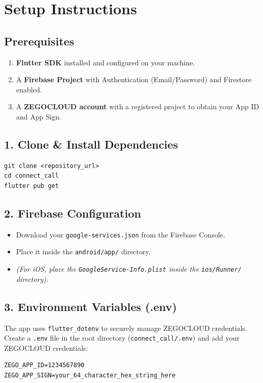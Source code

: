 \documentclass[11pt,a4paper]{article}
\begin{document}
\section*{Setup Instructions}

\subsection*{Prerequisites}
\begin{enumerate}
    \item \textbf{Flutter SDK} installed and configured on your machine.
    \item A \textbf{Firebase Project} with Authentication (Email/Password) and Firestore enabled.
    \item A \textbf{ZEGOCLOUD account} with a registered project to obtain your App ID and App Sign.
\end{enumerate}

\subsection*{1. Clone \& Install Dependencies}
\begin{verbatim}
git clone <repository_url>
cd connect_call
flutter pub get
\end{verbatim}

\subsection*{2. Firebase Configuration}
\begin{itemize}
    \item Download your \texttt{google-services.json} from the Firebase Console.
    \item Place it inside the \texttt{android/app/} directory.
    \item \textit{(For iOS, place the \texttt{GoogleService-Info.plist} inside the \texttt{ios/Runner/} directory).}
\end{itemize}

\subsection*{3. Environment Variables (.env)}
The app uses \texttt{flutter\_dotenv} to securely manage ZEGOCLOUD credentials. Create a \texttt{.env} file in the root directory (\texttt{connect\_call/.env}) and add your ZEGOCLOUD credentials:

\begin{verbatim}
ZEGO_APP_ID=1234567890
ZEGO_APP_SIGN=your_64_character_hex_string_here
\end{verbatim}
\end{document}
